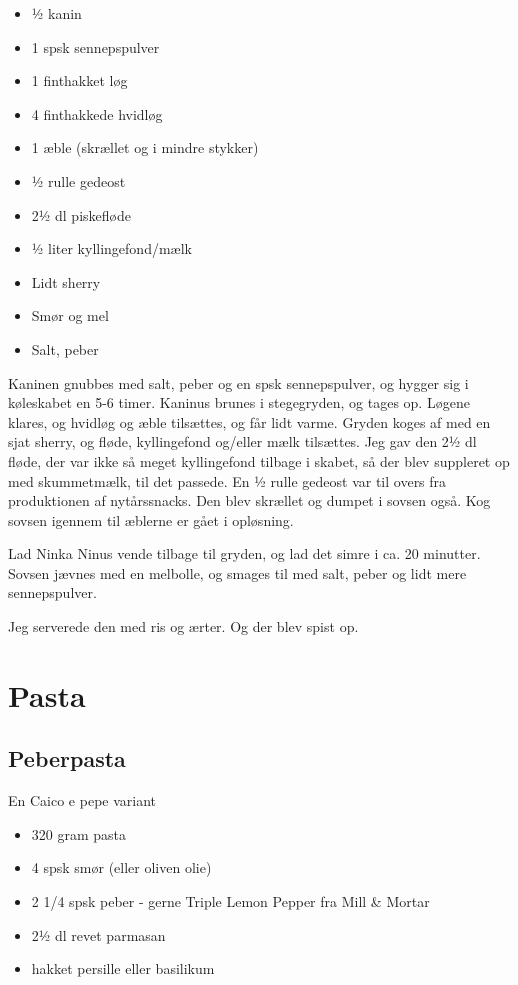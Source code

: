 \documentclass[
]{book}
\providecommand{\tightlist}{%
  \setlength{\itemsep}{0pt}\setlength{\parskip}{0pt}}
\begin{document}
\begin{itemize}
\tightlist
\item
  ½ kanin
\item
  1 spsk sennepspulver
\item
  1 finthakket løg
\item
  4 finthakkede hvidløg
\item
  1 æble (skrællet og i mindre stykker)
\item
  ½ rulle gedeost
\item
  2½ dl piskefløde
\item
  ½ liter kyllingefond/mælk
\item
  Lidt sherry
\item
  Smør og mel
\item
  Salt, peber
\end{itemize}

Kaninen gnubbes med salt, peber og en spsk sennepspulver, og hygger sig i køleskabet en 5-6 timer.
Kaninus brunes i stegegryden, og tages op.
Løgene klares, og hvidløg og æble tilsættes, og får lidt varme.
Gryden koges af med en sjat sherry, og fløde, kyllingefond og/eller mælk tilsættes.
Jeg gav den 2½ dl fløde, der var ikke så meget kyllingefond tilbage i skabet, så der blev suppleret op med skummetmælk, til det passede.
En ½ rulle gedeost var til overs fra produktionen af nytårssnacks. Den blev skrællet og dumpet i sovsen også. Kog sovsen igennem til æblerne er gået i opløsning.

Lad Ninka Ninus vende tilbage til gryden, og lad det simre i ca. 20 minutter.
Sovsen jævnes med en melbolle, og smages til med salt, peber og lidt mere sennepspulver.

Jeg serverede den med ris og ærter. Og der blev spist op.

\hypertarget{pasta}{%
\chapter{Pasta}\label{pasta}}

\hypertarget{peberpasta}{%
\section{Peberpasta}\label{peberpasta}}

En Caico e pepe variant

\begin{itemize}
\tightlist
\item
  320 gram pasta
\item
  4 spsk smør (eller oliven olie)
\item
  2 1/4 spsk peber - gerne Triple Lemon Pepper fra Mill \& Mortar
\item
  2½ dl revet parmasan
\item
  hakket persille eller basilikum
\end{itemize}
\end{document}
